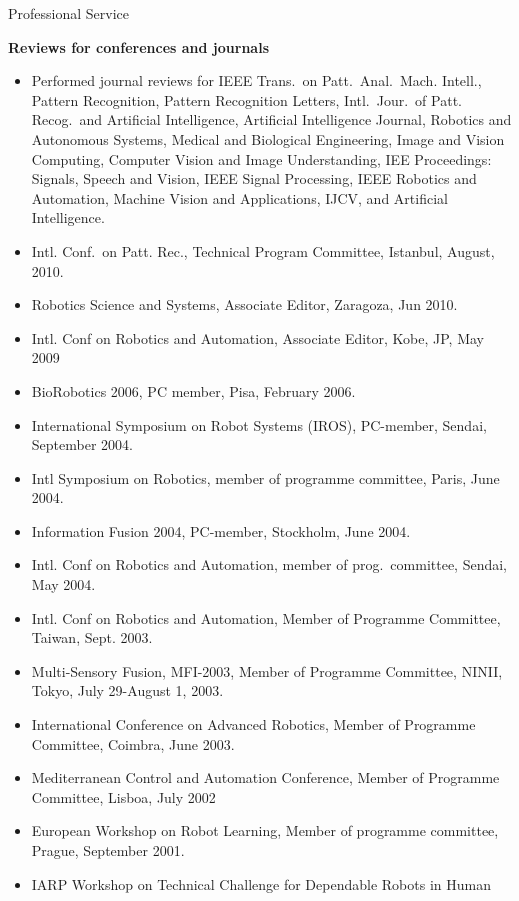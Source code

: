 \documentclass{article}
\begin{document}
\begin{cv}
\begin{cvlist}{Professional Service}
		\item {\bf Reviews for conferences and journals}
		\begin{itemize}
			\item Performed journal reviews for IEEE Trans.\ on Patt.\ Anal.\ Mach. Intell.,
			      Pattern Recognition, Pattern Recognition Letters, Intl.\ Jour.\ of Patt.\@
			      Recog.\ and Artificial Intelligence, Artificial Intelligence Journal,
			      Robotics and Autonomous Systems, Medical and Biological Engineering,
			      Image and Vision Computing, Computer Vision and Image Understanding,
			      IEE Proceedings: Signals, Speech and Vision, IEEE Signal Processing,
			      IEEE Robotics and Automation, Machine Vision and Applications, IJCV,
			      and Artificial Intelligence.
			\item Intl. Conf.\ on Patt. Rec., Technical Program Committee, Istanbul,
			      August, 2010.
			\item Robotics Science and Systems, Associate Editor, Zaragoza, Jun 2010.
			\item Intl. Conf on Robotics and Automation, Associate Editor, Kobe, JP, May
			      2009
			\item BioRobotics 2006, PC member, Pisa, February 2006.
			\item International Symposium on Robot Systems (IROS), PC-member, Sendai,
			      September 2004.
			\item Intl Symposium on Robotics, member of programme committee, Paris, June
			      2004.
			\item Information Fusion 2004, PC-member, Stockholm, June 2004.
			\item Intl. Conf on Robotics and Automation, member of prog.\ committee, Sendai,
			      May 2004.
			\item Intl. Conf on Robotics and Automation, Member of Programme Committee,
			      Taiwan, Sept. 2003.
			\item Multi-Sensory Fusion, MFI-2003, Member of Programme Committee, NINII,
			      Tokyo, July 29-August 1, 2003.
			\item International Conference on Advanced Robotics, Member of Programme
			      Committee, Coimbra, June 2003.
			\item Mediterranean Control and Automation Conference, Member of Programme
			      Committee, Lisboa, July 2002
			\item European Workshop on Robot Learning, Member of programme committee,
			      Prague, September 2001.
			\item IARP Workshop on Technical Challenge for Dependable Robots in Human

\end{itemize}
\end{cvlist}
\end{cv}
\end{document}
